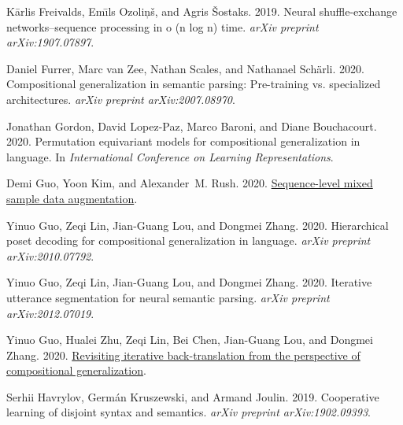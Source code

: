 \documentclass[11pt,a4paper]{article}
\begin{document}
\begin{thebibliography}{57}
K{\=a}rlis Freivalds, Em{\=\i}ls Ozoli{\c{n}}{\v{s}}, and Agris {\v{S}}ostaks.
  2019.
\newblock Neural shuffle-exchange networks--sequence processing in o (n log n)
  time.
\newblock \emph{arXiv preprint arXiv:1907.07897}.

Daniel Furrer, Marc van Zee, Nathan Scales, and Nathanael Sch{\"a}rli. 2020.
\newblock Compositional generalization in semantic parsing: Pre-training vs.
  specialized architectures.
\newblock \emph{arXiv preprint arXiv:2007.08970}.

Jonathan Gordon, David Lopez-Paz, Marco Baroni, and Diane Bouchacourt. 2020.
\newblock Permutation equivariant models for compositional generalization in
  language.
\newblock In \emph{International Conference on Learning Representations}.

Demi Guo, Yoon Kim, and Alexander~M. Rush. 2020{}.
\newblock \href {http://arxiv.org/abs/2011.09039} {Sequence-level mixed sample
  data augmentation}.

Yinuo Guo, Zeqi Lin, Jian-Guang Lou, and Dongmei Zhang. 2020{}.
\newblock Hierarchical poset decoding for compositional generalization in
  language.
\newblock \emph{arXiv preprint arXiv:2010.07792}.

Yinuo Guo, Zeqi Lin, Jian-Guang Lou, and Dongmei Zhang. 2020{}.
\newblock Iterative utterance segmentation for neural semantic parsing.
\newblock \emph{arXiv preprint arXiv:2012.07019}.

Yinuo Guo, Hualei Zhu, Zeqi Lin, Bei Chen, Jian-Guang Lou, and Dongmei Zhang.
  2020{}.
\newblock \href {http://arxiv.org/abs/2012.04276} {Revisiting iterative
  back-translation from the perspective of compositional generalization}.

Serhii Havrylov, Germ{\'a}n Kruszewski, and Armand Joulin. 2019.
\newblock Cooperative learning of disjoint syntax and semantics.
\newblock \emph{arXiv preprint arXiv:1902.09393}.


\end{thebibliography}
\end{document}
